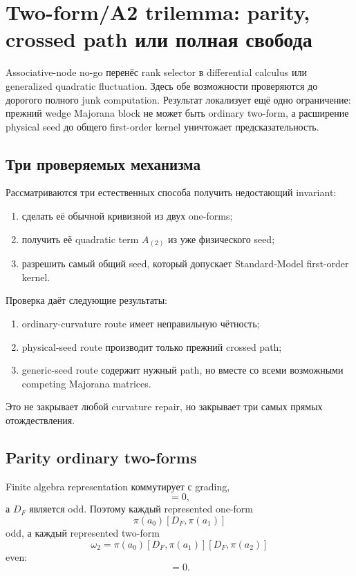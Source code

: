 \chapter{Two-form/A2 trilemma: parity, crossed path или полная свобода}

Associative-node no-go перенёс rank selector в differential calculus или
generalized quadratic fluctuation. Здесь обе возможности проверяются до
дорогого полного junk computation. Результат локализует ещё одно
ограничение: прежний wedge Majorana block не может быть ordinary two-form,
а расширение physical seed до общего first-order kernel уничтожает
предсказательность.

\section{Три проверяемых механизма}

Рассматриваются три естественных способа получить недостающий invariant:
\begin{enumerate}
 \item сделать её обычной кривизной из двух one-forms;
 \item получить её quadratic term \(A_{(2)}\) из уже физического seed;
 \item разрешить самый общий seed, который допускает Standard-Model
 first-order kernel.
\end{enumerate}
Проверка даёт следующие результаты:
\begin{enumerate}
 \item ordinary-curvature route имеет неправильную чётность;
 \item physical-seed route производит только прежний crossed path;
 \item generic-seed route содержит нужный path, но вместе со всеми
 возможными competing Majorana matrices.
\end{enumerate}
Это не закрывает любой curvature repair, но закрывает три самых прямых
отождествления.

\section{Parity ordinary two-forms}

Finite algebra representation коммутирует с grading,
\begin{equation}
 [\pi(a),\Gamma_F]=0,
\end{equation}
а \(D_F\) является odd. Поэтому каждый represented one-form
\begin{equation}
 \pi(a_0)[D_F,\pi(a_1)]
\end{equation}
odd, а каждый represented two-form
\begin{equation}
 \omega_2
 =\pi(a_0)[D_F,\pi(a_1)][D_F,\pi(a_2)]
\end{equation}
even:
\begin{equation}
 [\omega_2,\Gamma_F]=0.
 \label{eq:ps-twoform-even}
\end{equation}

